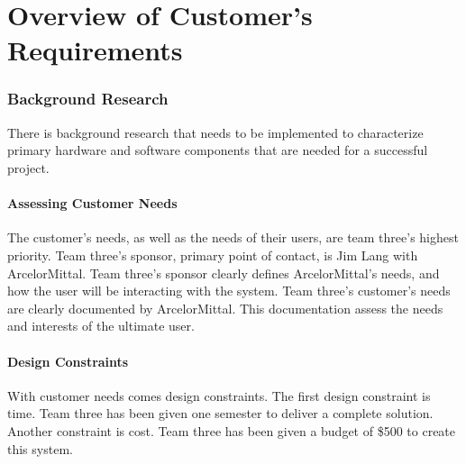 \documentclass[Letter,11pt]{article}
\begin{document}
	
			\tableofcontents
			\listoffigures
			\begingroup
			\let\clearpage\relax
			\listoftables
			\endgroup
			\newpage


\part{Overview of Customer's Requirements}
\section{Background Research}\label{research}
	There is background research that needs to be implemented to characterize primary hardware and software components that are needed for a successful project. \\
	\subsection{Assessing Customer Needs}

	The customer's needs, as well as the needs of their users, are team three's highest priority. Team three's sponsor, primary point of contact, is Jim Lang with ArcelorMittal. Team three's sponsor clearly defines ArcelorMittal's needs, and how the user will be interacting with the system. Team three's customer's needs are clearly documented by ArcelorMittal. This documentation assess the needs and interests of the ultimate user. \\ 


	\subsection{Design Constraints}
	With customer needs comes design constraints. The first design constraint is time. Team three has been given one semester to deliver a complete solution. Another constraint is cost. Team three has been given a budget of \$500 to create this system.\\
\end{document}
